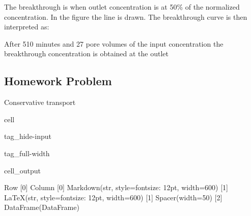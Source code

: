 \documentclass[letterpaper,10pt,english]{jupyterBook}
\begin{document}
\sphinxAtStartPar
The breakthrough is when outlet concentration is at 50\% of the normalized concentration. In the figure the line is drawn. The breakthrough curve is then interpreted as:

\sphinxAtStartPar
After 510 minutes and 27 pore volumes of the input concentration the breakthrough concentration is obtained at the outlet


\subsection{Homework Problem}
\label{\detokenize{content/tutorials/T8/tutorial_08:homework-problem}}
\sphinxAtStartPar
{} \sphinxhyphen{} Conservative transport

\begin{sphinxuseclass}{cell}
\begin{sphinxuseclass}{tag_hide-input}
\begin{sphinxuseclass}{tag_full-width}\begin{sphinxVerbatimOutput}

\begin{sphinxuseclass}{cell_output}
\begin{sphinxVerbatim}[commandchars=\\\{\}]
Row
    [0] Column
        [0] Markdown(str, style=\PYGZob{}\PYGZsq{}font\PYGZhy{}size\PYGZsq{}: \PYGZsq{}12pt\PYGZsq{}\PYGZcb{}, width=600)
        [1] LaTeX(str, style=\PYGZob{}\PYGZsq{}font\PYGZhy{}size\PYGZsq{}: \PYGZsq{}12pt\PYGZsq{}\PYGZcb{}, width=600)
    [1] Spacer(width=50)
    [2] DataFrame(DataFrame)
\end{sphinxVerbatim}

\end{sphinxuseclass}\end{sphinxVerbatimOutput}

\end{sphinxuseclass}
\end{sphinxuseclass}
\end{sphinxuseclass}
\sphinxstepscope
\end{document}
